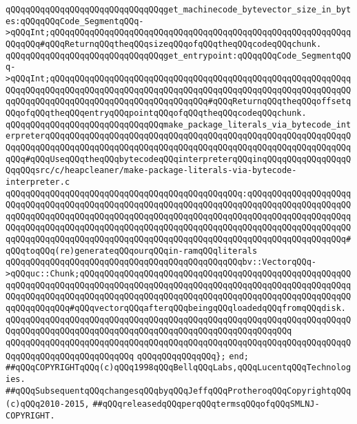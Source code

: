 \newline
\newline
\verb|qQQqqQQqqQQqqQQqqQQqqQQqqQQqqQQqget_machinecode_bytevector_size_in_bytes:qQQqqQQqCode_SegmentqQQq->qQQqInt;qQQqqQQqqQQqqQQqqQQqqQQqqQQqqQQqqQQqqQQqqQQqqQQqqQQqqQQqqQQqqQQqqQQq#qQQqReturnqQQqtheqQQqsizeqQQqofqQQqtheqQQqcodeqQQqchunk.|\newline
\newline
\verb|qQQqqQQqqQQqqQQqqQQqqQQqqQQqqQQqget_entrypoint:qQQqqQQqCode_SegmentqQQq->qQQqInt;qQQqqQQqqQQqqQQqqQQqqQQqqQQqqQQqqQQqqQQqqQQqqQQqqQQqqQQqqQQqqQQqqQQqqQQqqQQqqQQqqQQqqQQqqQQqqQQqqQQqqQQqqQQqqQQqqQQqqQQqqQQqqQQqqQQqqQQqqQQqqQQqqQQqqQQqqQQqqQQqqQQqqQQqqQQq#qQQqReturnqQQqtheqQQqoffsetqQQqofqQQqtheqQQqentryqQQqpointqQQqofqQQqtheqQQqcodeqQQqchunk.|\newline
\newline
\verb|qQQqqQQqqQQqqQQqqQQqqQQqqQQqqQQqmake_package_literals_via_bytecode_interpreterqQQqqQQqqQQqqQQqqQQqqQQqqQQqqQQqqQQqqQQqqQQqqQQqqQQqqQQqqQQqqQQqqQQqqQQqqQQqqQQqqQQqqQQqqQQqqQQqqQQqqQQqqQQqqQQqqQQqqQQqqQQqqQQqqQQqqQQq#qQQqUseqQQqtheqQQqbytecodeqQQqinterpreterqQQqinqQQqqQQqqQQqqQQqqQQqqQQqsrc/c/heapcleaner/make-package-literals-via-bytecode-interpreter.c|\newline
\verb|qQQqqQQqqQQqqQQqqQQqqQQqqQQqqQQqqQQqqQQqqQQqqQQq:qQQqqQQqqQQqqQQqqQQqqQQqqQQqqQQqqQQqqQQqqQQqqQQqqQQqqQQqqQQqqQQqqQQqqQQqqQQqqQQqqQQqqQQqqQQqqQQqqQQqqQQqqQQqqQQqqQQqqQQqqQQqqQQqqQQqqQQqqQQqqQQqqQQqqQQqqQQqqQQqqQQqqQQqqQQqqQQqqQQqqQQqqQQqqQQqqQQqqQQqqQQqqQQqqQQqqQQqqQQqqQQqqQQqqQQqqQQqqQQqqQQqqQQqqQQqqQQqqQQqqQQqqQQqqQQqqQQqqQQqqQQqqQQqqQQqqQQqqQQq#qQQqtoqQQq(re)generateqQQqourqQQqin-ramqQQqliterals|\newline
\verb|qQQqqQQqqQQqqQQqqQQqqQQqqQQqqQQqqQQqqQQqqQQqqQQqbv::VectorqQQq->qQQquc::Chunk;qQQqqQQqqQQqqQQqqQQqqQQqqQQqqQQqqQQqqQQqqQQqqQQqqQQqqQQqqQQqqQQqqQQqqQQqqQQqqQQqqQQqqQQqqQQqqQQqqQQqqQQqqQQqqQQqqQQqqQQqqQQqqQQqqQQqqQQqqQQqqQQqqQQqqQQqqQQqqQQqqQQqqQQqqQQqqQQqqQQqqQQqqQQqqQQqqQQqqQQqqQQqqQQq#qQQqvectorqQQqafterqQQqbeingqQQqloadedqQQqfromqQQqdisk.|\newline
\verb|qQQqqQQqqQQqqQQqqQQqqQQqqQQqqQQqqQQqqQQqqQQqqQQqqQQqqQQqqQQqqQQqqQQqqQQqqQQqqQQqqQQqqQQqqQQqqQQqqQQqqQQqqQQqqQQqqQQqqQQqqQQqqQQq|\newline
\verb|qQQqqQQqqQQqqQQqqQQqqQQqqQQqqQQqqQQqqQQqqQQqqQQqqQQqqQQqqQQqqQQqqQQqqQQqqQQqqQQqqQQqqQQqqQQqqQQq|\newline
\newline
\verb|qQQqqQQqqQQqqQQq};|\newline
\verb|end;|\newline
\newline
\newline
\verb|##qQQqCOPYRIGHTqQQq(c)qQQq1998qQQqBellqQQqLabs,qQQqLucentqQQqTechnologies.|\newline
\verb|##qQQqSubsequentqQQqchangesqQQqbyqQQqJeffqQQqProtheroqQQqCopyrightqQQq(c)qQQq2010-2015,|\newline
\verb|##qQQqreleasedqQQqperqQQqtermsqQQqofqQQqSMLNJ-COPYRIGHT.|\newline

